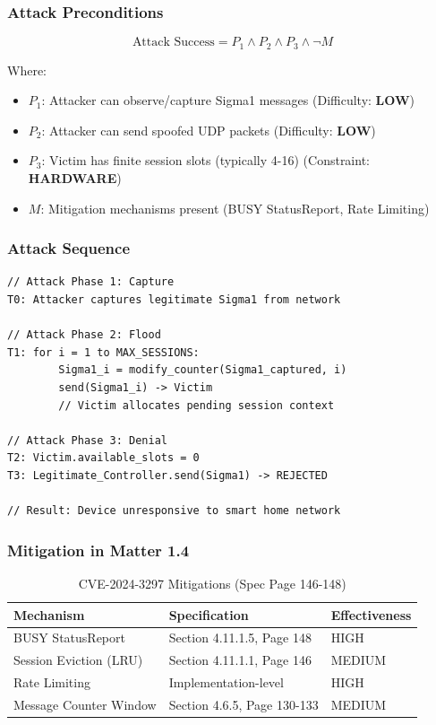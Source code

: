 \documentclass[11pt,a4paper]{article}
\begin{document}
\subsubsection{Attack Preconditions}

\begin{equation}
    \text{Attack Success} = P_1 \land P_2 \land P_3 \land \neg M
\end{equation}

Where:
\begin{itemize}
    \item $P_1$: Attacker can observe/capture Sigma1 messages (Difficulty: \textbf{LOW})
    \item $P_2$: Attacker can send spoofed UDP packets (Difficulty: \textbf{LOW})
    \item $P_3$: Victim has finite session slots (typically 4-16) (Constraint: \textbf{HARDWARE})
    \item $M$: Mitigation mechanisms present (BUSY StatusReport, Rate Limiting)
\end{itemize}

\subsubsection{Attack Sequence}

\begin{lstlisting}[style=protocol, caption={DeeDoS Attack Sequence}]
// Attack Phase 1: Capture
T0: Attacker captures legitimate Sigma1 from network

// Attack Phase 2: Flood
T1: for i = 1 to MAX_SESSIONS:
        Sigma1_i = modify_counter(Sigma1_captured, i)
        send(Sigma1_i) -> Victim
        // Victim allocates pending session context

// Attack Phase 3: Denial
T2: Victim.available_slots = 0
T3: Legitimate_Controller.send(Sigma1) -> REJECTED

// Result: Device unresponsive to smart home network
\end{lstlisting}

\subsubsection{Mitigation in Matter 1.4}

\begin{table}[H]
    \centering
    \caption{CVE-2024-3297 Mitigations (Spec Page 146-148)}
    \begin{tabular}{lll}
        \toprule
        \textbf{Mechanism} & \textbf{Specification} & \textbf{Effectiveness} \\
        \midrule
        BUSY StatusReport & Section 4.11.1.5, Page 148 & HIGH \\
        Session Eviction (LRU) & Section 4.11.1.1, Page 146 & MEDIUM \\
        Rate Limiting & Implementation-level & HIGH \\
        Message Counter Window & Section 4.6.5, Page 130-133 & MEDIUM \\
        \bottomrule
    \end{tabular}
\end{table}
\end{document}
